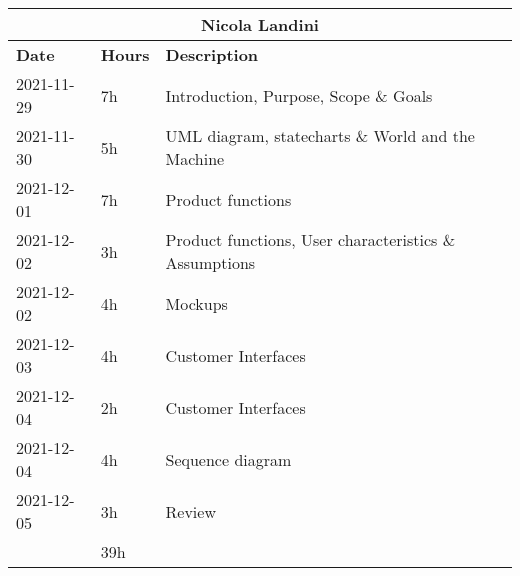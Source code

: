\begin{table}[H]
    \centering
    \begin{tabular}{|l|l|l|}
        \multicolumn{3}{c}{\textbf{Nicola Landini}}                      \\
        \hline
        \textbf{Date} & \textbf{Hours} & \textbf{Description}                                   \\\hline
        2021-11-29    & 7h             & Introduction, Purpose, Scope \& Goals                  \\\hline
        2021-11-30    & 5h             & UML diagram, statecharts \& World and the Machine      \\\hline
        2021-12-01    & 7h             & Product functions                                      \\\hline
        2021-12-02    & 3h             & Product functions, User characteristics \& Assumptions \\\hline
        2021-12-02    & 4h             & Mockups                                                \\\hline
        2021-12-03    & 4h             & Customer Interfaces                                    \\\hline
        2021-12-04    & 2h             & Customer Interfaces                                    \\\hline
        2021-12-04    & 4h             & Sequence diagram                                       \\\hline
        2021-12-05    & 3h             & Review                                                 \\\hline\hline
                      & 39h            &                                                        \\\hline
    \end{tabular}
\end{table}
